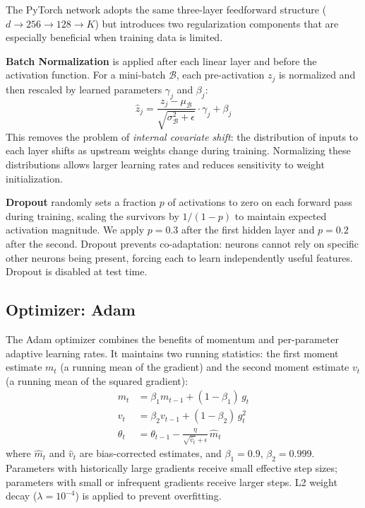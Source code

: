 \documentclass[12pt]{article}
\begin{document}
The PyTorch network adopts the same three-layer feedforward structure
($d \to 256 \to 128 \to K$) but introduces two regularization components that are
especially beneficial when training data is limited.

\textbf{Batch Normalization} \cite{ioffe2015} is applied after each linear layer and
before the activation function. For a mini-batch $\mathcal{B}$, each pre-activation
$z_j$ is normalized and then rescaled by learned parameters $\gamma_j$ and $\beta_j$:
\[
  \hat{z}_j =
  \frac{z_j - \mu_{\mathcal{B}}}{\sqrt{\sigma^2_{\mathcal{B}} + \epsilon}}
  \cdot \gamma_j + \beta_j
\]
This removes the problem of \emph{internal covariate shift}: the distribution of inputs
to each layer shifts as upstream weights change during training. Normalizing these
distributions allows larger learning rates and reduces sensitivity to weight initialization.

\textbf{Dropout} \cite{srivastava2014} randomly sets a fraction $p$ of activations to
zero on each forward pass during training, scaling the survivors by $1/(1-p)$ to maintain
expected activation magnitude. We apply $p = 0.3$ after the first hidden layer and
$p = 0.2$ after the second. Dropout prevents co-adaptation: neurons cannot rely on
specific other neurons being present, forcing each to learn independently useful features.
Dropout is disabled at test time.

\subsection{Optimizer: Adam}

The Adam optimizer \cite{kingma2014} combines the benefits of momentum and per-parameter
adaptive learning rates. It maintains two running statistics: the first moment estimate
$m_t$ (a running mean of the gradient) and the second moment estimate $v_t$ (a running
mean of the squared gradient):
\begin{align*}
  m_t &= \beta_1 m_{t-1} + (1 - \beta_1)\,g_t \\
  v_t &= \beta_2 v_{t-1} + (1 - \beta_2)\,g_t^2 \\
  \theta_t &= \theta_{t-1} -
  \frac{\eta}{\sqrt{\hat{v}_t} + \epsilon}\,\hat{m}_t
\end{align*}
where $\hat{m}_t$ and $\hat{v}_t$ are bias-corrected estimates, and
$\beta_1 = 0.9$, $\beta_2 = 0.999$. Parameters with historically large gradients receive
small effective step sizes; parameters with small or infrequent gradients receive larger
steps. L2 weight decay ($\lambda = 10^{-4}$) is applied to prevent overfitting.
\end{document}
